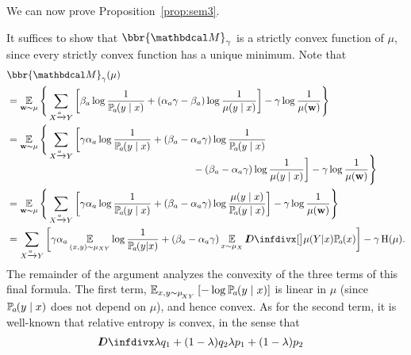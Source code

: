 \begin{subappendices}
We can now prove         Proposition~\ref{prop:sem3}.
\begin{lproof}\label{proof:sem3}
It suffices to show that $\bbr{\dg
			  M}_\gamma$ is a strictly convex function of $\mu$,
since every strictly convex function has a unique minimum.
Note that
\begin{align*}
&   \bbr{\dg M}_\gamma(\mu) 
\\	&= \Ex_{\mat w \sim \mu} \Bigg\{   \sum_{ X \xrightarrow{\!\!a} Y  } \left[
		\beta_a \log \frac{1}{\p_a(y\mid x)} + ({\alpha_a}\gamma - \beta_a ) \log \frac{1}{\mu(y \mid x)} \right] - \gamma \log \frac{1}{\mu(\mat w)} \Bigg\} \\
	&= \Ex_{\mat w \sim \mu} \Bigg\{   \sum_{ X \xrightarrow{\!\!a} Y  } \bigg[ \gamma {\alpha_a} \log \frac{1}{\p_a(y\mid x)} + 
		(\beta_a - {\alpha_a} \gamma) \log \frac{1}{\p_a(y\mid x)} \\[-2ex]
        &\hspace{6.5cm}- (\beta_a - {\alpha_a} \gamma) \log \frac{1}{\mu(y \mid x)} \bigg] - \gamma \log \frac{1}{\mu(\mat w)} \Bigg\}  \\
	&= \Ex_{\mat w \sim \mu} \Bigg\{   \sum_{ X \xrightarrow{\!\!a} Y  } \left[ \gamma {\alpha_a} \log \frac{1}{\p_a(y\mid x)} + 
		(\beta_a - {\alpha_a} \gamma) \log \frac{\mu(y\mid x)}{\p_a(y\mid x)} \right] - \gamma \log \frac{1}{\mu(\mat w)} \Bigg\} \\
	&=  \sum_{ X \xrightarrow{\!\!a} Y  } \left[ \gamma {\alpha_a} 
        \Ex_{\vphantom{|}(x,y) \sim \mu_{XY}}
            \log \frac{1}{\p_a(y| x)} + 
		(\beta_a - {\alpha_a} \gamma) \Ex_{x\sim\mu_X}
          \kldiv[\big]{\mu(Y | x)}{\p_a(x)} \right] - \gamma \H(\mu). 
\end{align*}
The remainder of the argument analyzes the convexity of
    the three terms of this final formula. 
The first term, 
\( \Ex_{x,y \sim \mu_{\!_{XY}}} \left[-\log {\p_a(y\mid x)}\right] \) 
is linear in $\mu$ (since $\p_a(y\mid x)$ does not depend on $\mu$), and hence convex. %
As for the second term, it is well-known that relative entropy is convex, in the sense that 
\begin{align*}
    &\kldiv{\lambda q_1 + (1-\lambda) q_2 }{ \lambda p_1 + (1-\lambda) p_2}

\end{align*}
\end{lproof}
\end{subappendices}
